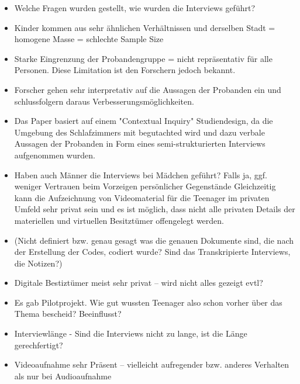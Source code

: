 \documentclass{hsflensburg}
\begin{document}
	\begin{itemize}
	\item Welche Fragen wurden gestellt, wie wurden die Interviews geführt?
	\item Kinder kommen aus sehr ähnlichen Verhältnissen und derselben Stadt = homogene Masse = schlechte Sample Size
	\item Starke Eingrenzung der Probandengruppe = nicht repräsentativ für alle Personen. Diese Limitation ist den Forschern jedoch bekannt.
	\item Forscher gehen sehr interpretativ auf die Aussagen der Probanden ein und schlussfolgern daraus Verbesserungsmöglichkeiten.
	\item Das Paper basiert auf einem "Contextual Inquiry" Studiendesign, da die Umgebung des Schlafzimmers mit begutachted wird und dazu verbale Aussagen der Probanden in Form eines semi-strukturierten Interviews aufgenommen wurden.
	\item Haben auch Männer die Interviews bei Mädchen geführt? Falls ja, ggf. weniger Vertrauen beim Vorzeigen persönlicher Gegenstände
	Gleichzeitig kann die Aufzeichnung von Videomaterial für die Teenager im privaten Umfeld sehr privat sein und es ist möglich, dass nicht alle privaten Details der materiellen und virtuellen Besitztümer offengelegt werden.  
	\item (Nicht definiert bzw. genau gesagt was die genauen Dokumente sind, die nach der Erstellung der Codes, codiert wurde? Sind
		das Transkripierte Interviews, die Notizen?)
		\item Digitale Bestiztümer meist sehr privat – wird nicht alles gezeigt evtl?
		\item Es gab Pilotprojekt. Wie gut wussten Teenager also schon vorher über das Thema bescheid? Beeinflusst?
		\item Interviewlänge - Sind die Interviews nicht zu lange, ist die Länge gerechfertigt?
		\item Videoaufnahme sehr Präsent – vielleicht aufregender bzw. anderes Verhalten als nur bei Audioaufnahme
	\end{itemize}
	

	\clearpage
	\nocite{*}	
	
	
\end{document}
